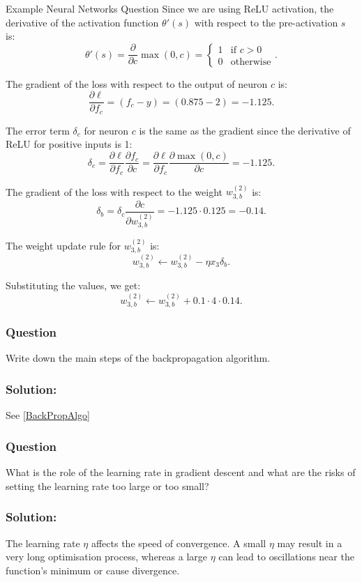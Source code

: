\begin{examplebox}{Example Neural Networks Question}
Since we are using ReLU activation, the derivative of the activation function \( \theta'(s) \) with respect to the pre-activation \( s \) is:
\[ \theta'(s) = \frac{\partial}{\partial c} \max(0, c) = 
\begin{cases} 
1 & \text{if } c > 0 \\
0 & \text{otherwise}
\end{cases}.
\]

The gradient of the loss with respect to the output of neuron \( c \) is:
\[ \frac{\partial \ell}{\partial f_c} = (f_c - y) = (0.875 - 2) = -1.125. \]

The error term \( \delta_c \) for neuron \( c \) is the same as the gradient since the derivative of ReLU for positive inputs is 1:
\[ \delta_c = \frac{\partial \ell}{\partial f_c} \frac{\partial f_c}{\partial c} =\frac{\partial \ell}{\partial f_c}  \frac{\partial  \max(0, c) }{\partial c}= -1.125. \]

The gradient of the loss with respect to the weight \( w_{3,b}^{(2)} \) is:
\[ \delta_b = \delta_c \frac{\partial c}{\partial w_{3,b}^{(2)}} = -1.125 \cdot 0.125 = -0.14. \]

The weight update rule for \( w_{3,b}^{(2)} \) is:
\[ w_{3,b}^{(2)} \leftarrow w_{3,b}^{(2)} - \eta x_3 \delta_b. \]

Substituting the values, we get:
\[ w_{3,b}^{(2)} \leftarrow w_{3,b}^{(2)} + 0.1 \cdot 4 \cdot 0.14. \]

\subsubsection*{Question}
Write down the main steps of the backpropagation algorithm.

\subsubsection*{Solution:} See \ref{BackPropAlgo}

\subsubsection*{Question}
What is the role of the learning rate in gradient descent and what are the risks of setting the learning rate too large or too small?

\subsubsection*{Solution:}
The learning rate \( \eta \) affects the speed of convergence. A small \( \eta \) may result in a very long optimisation process, whereas a large \( \eta \) can lead to oscillations near the function's minimum or cause divergence.

\end{examplebox}
